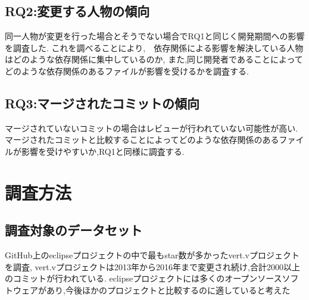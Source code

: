 \documentclass[submit,ses,noauthor]{ipsj} %
\begin{document}
\subsection{RQ2:変更する人物の傾向}
同一人物が変更を行った場合とそうでない場合でRQ1と同じく開発期間への影響を調査した.
これを調べることにより,　依存関係による影響を解決している人物はどのような依存関係に集中しているのか,
また,同じ開発者であることによってどのような依存関係のあるファイルが影響を受けるかを調査する.


\subsection{RQ3:マージされたコミットの傾向}
マージされていないコミットの場合はレビューが行われていない可能性が高い.
マージされたコミットと比較することによってどのような依存関係のあるファイルが影響を受けやすいか,RQ1と同様に調査する.


\section{調査方法}\label{調査方法}


\subsection{調査対象のデータセット}
GitHub上のeclipseプロジェクトの中で最もstar数が多かったvert.vプロジェクトを調査,
vert.vプロジェクトは2013年から2016年まで変更され続け,合計2000以上のコミットが行われている.
eclipseプロジェクトには多くのオープンソースソフトウェアがあり,今後ほかのプロジェクトと比較するのに適していると考えた
\end{document}

